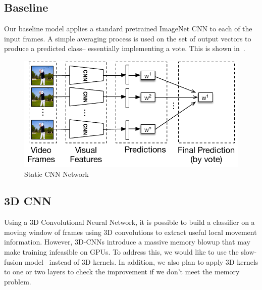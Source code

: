 \subsection{Baseline}
Our baseline model applies a standard pretrained ImageNet CNN to each of the input frames. A simple averaging process is used on the set of output vectors to produce a predicted class-- essentially implementing a vote. This is shown in~. 
\begin{figure}
  \centering
  \includegraphics[width=1.0\linewidth]{figs/cnn}
  \caption{Static CNN Network}
  \label{fig:cnn}
\end{figure}

\subsection{3D CNN}
Using a 3D Convolutional Neural Network, it is possible to build a classifier on a moving window
of frames using 3D convolutions to extract useful local movement information. However, 3D-CNNs introduce a massive memory blowup that may make training infeasible on GPUs.
To address this, we would like to use the slow-fusion model~\cite{cnnvid} instead of 3D kernels. In addition, we also plan to apply 3D kernels to one or two layers to check the improvement if we don't meet the memory problem.


